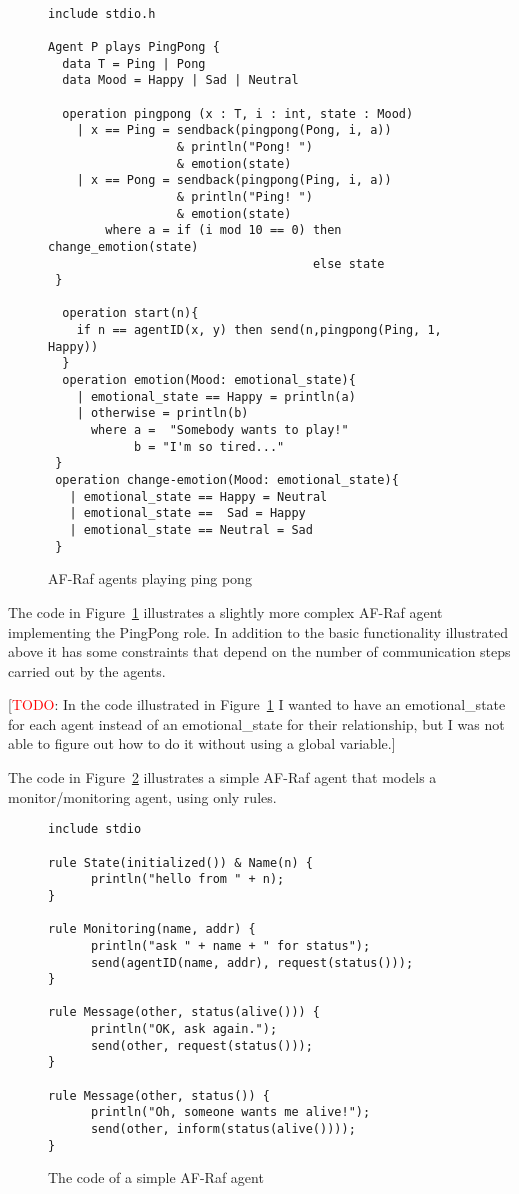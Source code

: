\documentclass[a4paper,12pt,oneside]{book} %
\theoremstyle{remark}
\theoremstyle{plain}
\newcommand{\todo}[1]{[\textcolor{red}{TODO}: #1]}
\newcommand{\rg}[1]{\marginpar{\tiny\raggedright\textcolor{blue}{\bf rg:} #1}}
\begin{document}
\rg{It's ${\it value}:{\it type}$, not ${\it type}:{\it value}$.}
\begin{figure}\footnotesize %
\begin{verbatim}

include stdio.h

Agent P plays PingPong {
  data T = Ping | Pong
  data Mood = Happy | Sad | Neutral

  operation pingpong (x : T, i : int, state : Mood)
    | x == Ping = sendback(pingpong(Pong, i, a))
                  & println("Pong! ")
                  & emotion(state)
    | x == Pong = sendback(pingpong(Ping, i, a))
                  & println("Ping! ")
                  & emotion(state)
        where a = if (i mod 10 == 0) then change_emotion(state)
                                     else state
 }

  operation start(n){
    if n == agentID(x, y) then send(n,pingpong(Ping, 1, Happy))
  }
  operation emotion(Mood: emotional_state){
    | emotional_state == Happy = println(a)
    | otherwise = println(b)
      where a =  "Somebody wants to play!"
            b = "I'm so tired..."
 }
 operation change-emotion(Mood: emotional_state){
   | emotional_state == Happy = Neutral
   | emotional_state ==  Sad = Happy
   | emotional_state == Neutral = Sad
 }
\end{verbatim}
\caption{AF-Raf agents playing ping pong}
\label{fig:AF-Raf-constraint-pingpong}
\end{figure} %

The code in Figure~\ref{fig:AF-Raf-constraint-pingpong} illustrates a
slightly more complex AF-Raf agent implementing the PingPong role. In
addition to the basic functionality illustrated above it has some
constraints that depend on the number of communication steps carried out by
the agents.


\todo{In the code illustrated in Figure~\ref{fig:AF-Raf-constraint-pingpong} I wanted
to have an emotional\_state for each agent instead of an emotional\_state
for their relationship, but I was not able to figure out how to do it
without using a global variable.}

The code in Figure~\ref{fig:AF-Raf-no-roles} illustrates a simple AF-Raf
agent that models a monitor/monitoring agent, using only rules.

\begin{figure}\footnotesize %
\begin{verbatim}
include stdio

rule State(initialized()) & Name(n) {
      println("hello from " + n);
}

rule Monitoring(name, addr) {
      println("ask " + name + " for status");
      send(agentID(name, addr), request(status()));
}

rule Message(other, status(alive())) {
      println("OK, ask again.");
      send(other, request(status()));
}

rule Message(other, status()) {
      println("Oh, someone wants me alive!");
      send(other, inform(status(alive())));
}
\end{verbatim}
\caption{The code of a simple AF-Raf agent}
\label{fig:AF-Raf-no-roles}
\end{figure} %
\end{document}

